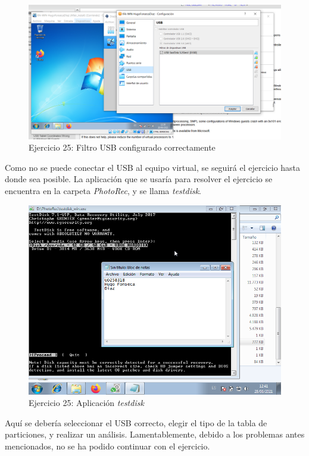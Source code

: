 \documentclass[11pt]{article}
\begin{document}
\begin{figure}[H]
    \caption{Ejercicio 25: Filtro USB configurado correctamente}
  \centering
    \includegraphics[scale=0.4]{p05/e25-5.PNG}
\end{figure}

Como no se puede conectar el USB al equipo virtual, se seguirá el ejercicio hasta donde sea posible. La aplicación que se usaría para resolver el ejercicio se encuentra en la carpeta \textit{PhotoRec}, y se llama \textit{testdisk}.

\begin{figure}[H]
    \caption{Ejercicio 25: Aplicación \textit{testdisk}}
  \centering
    \includegraphics[scale=0.8]{p05/e25-6.png}
\end{figure}

Aquí se debería seleccionar el USB correcto, elegir el tipo de la tabla de particiones, y realizar un análisis. Lamentablemente, debido a los problemas antes mencionados, no se ha podido continuar con el ejercicio.
\end{document}

